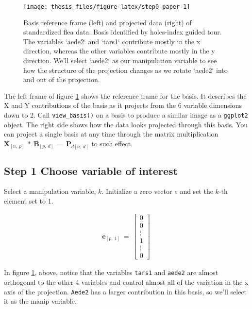 \documentclass{monashthesis}
\begin{document}
\begin{figure}

{\centering \texttt{[image: thesis\_files/figure-latex/step0-paper-1]} 

}

\caption{Basis reference frame (left) and projected data (right) of standardized flea data. Basis identified by holes-index guided tour. The variables `aede2` and `tars1` contribute mostly in the x direction, whereas the other variables contribute mostly in the y direction. We'll select `aede2` as our manipulation variable to see how the structure of the projection changes as we rotate `aede2` into and out of the projection.}\label{fig:step0-paper}
\end{figure}

The left frame of figure \ref{fig:step0-paper} shows the reference frame
for the basis. It describes the X and Y contributions of the basis as it
projects from the 6 variable dimensions down to 2. Call
\texttt{view\_basis()} on a basis to produce a similar image as a
\texttt{ggplot2} object. The right side shows how the data looks
projected through this basis. You can project a single basis at any time
through the matrix multiplication
\(\textbf{X}_{[n,~p]} ~*~ \textbf{B}_{[p,~d]} ~=~ \textbf{P}_{d[n,~d]}\)
to such effect.

\subsection{Step 1 Choose variable of
interest}\label{step-1-choose-variable-of-interest-1}

Select a manipulation variable, \(k\). Initialize a zero vector \(e\)
and set the \(k\)-th element set to 1.

\begin{align*}
\textbf{e}_{[p,~1]} ~=~
  \begin{bmatrix}
    0 \\
    0 \\
    \vdots \\
    1 \\
    \vdots \\
    0
  \end{bmatrix}
\end{align*}

In figure \ref{fig:step0-paper}, above, notice that the variables
\texttt{tars1} and \texttt{aede2} are almost orthogonal to the other 4
variables and control almost all of the variation in the x axis of the
projection. \texttt{Aede2} has a larger contribution in this basis, so
we'll select it as the manip variable.
\end{document}
